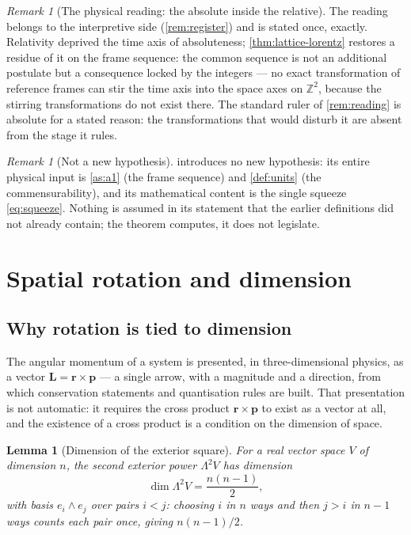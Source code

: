 \documentclass[11pt]{amsbook}
\theoremstyle{plain}
\newtheorem{lemma}[theorem]{Lemma}
\theoremstyle{definition}
\theoremstyle{remark}
\newtheorem{remark}[theorem]{Remark}
\begin{document}
\begin{remark}[The physical reading: the absolute inside the relative]\label{rem:absolute-ruler}
The reading belongs to the interpretive side (\cref{rem:register}) and is stated once, exactly. Relativity deprived the time axis of absoluteness; \cref{thm:lattice-lorentz} restores a residue of it on the frame sequence: the common sequence is not an additional postulate but a consequence locked by the integers --- no exact transformation of reference frames can stir the time axis into the space axes on $\mathbb{Z}^{2}$, because the stirring transformations do not exist there. The standard ruler of \cref{rem:reading} is absolute for a stated reason: the transformations that would disturb it are absent from the stage it rules.
\end{remark}

\begin{remark}[Not a new hypothesis]\label{rem:not-axiom}
 introduces no new hypothesis: its entire physical input is \cref{as:a1} (the frame sequence) and \cref{def:units} (the commensurability), and its mathematical content is the single squeeze \cref{eq:squeeze}. Nothing is assumed in its statement that the earlier definitions did not already contain; the theorem computes, it does not legislate.
\end{remark}

\section{Spatial rotation and dimension}\label{sec:rotation}

\subsection{Why rotation is tied to dimension}\label{sec:rigidity}

The angular momentum of a system is presented, in three-dimensional physics, as a vector $\mathbf L = \mathbf r \times \mathbf p$ --- a single arrow, with a magnitude and a direction, from which conservation statements and quantisation rules are built. That presentation is not automatic: it requires the cross product $\mathbf r \times \mathbf p$ to exist as a vector at all, and the existence of a cross product is a condition on the dimension of space.

\begin{lemma}[Dimension of the exterior square]\label{lem:exterior-dim}
For a real vector space $V$ of dimension $n$, the second exterior power $\Lambda^{2}V$ has dimension
\begin{equation}\label{eq:exterior-dim}
\dim \Lambda^{2}V = \frac{n(n-1)}{2},
\end{equation}
with basis $e_{i} \wedge e_{j}$ over pairs $i < j$: choosing $i$ in $n$ ways and then $j > i$ in $n-1$ ways counts each pair once, giving $n(n-1)/2$.
\end{lemma}
\end{document}
